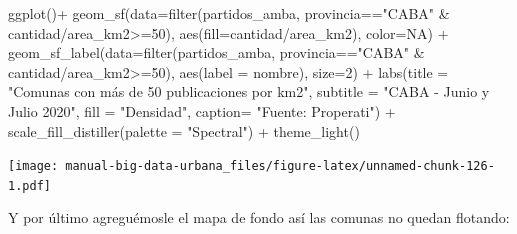 \documentclass[
  spanish,
]{book}
\newenvironment{Shaded}{\begin{snugshade}}{\end{snugshade}}
\newcommand{\AttributeTok}[1]{\textcolor[rgb]{0.77,0.63,0.00}{#1}}
\newcommand{\ConstantTok}[1]{\textcolor[rgb]{0.00,0.00,0.00}{#1}}
\newcommand{\DecValTok}[1]{\textcolor[rgb]{0.00,0.00,0.81}{#1}}
\newcommand{\FunctionTok}[1]{\textcolor[rgb]{0.00,0.00,0.00}{#1}}
\newcommand{\NormalTok}[1]{#1}
\newcommand{\SpecialCharTok}[1]{\textcolor[rgb]{0.00,0.00,0.00}{#1}}
\newcommand{\StringTok}[1]{\textcolor[rgb]{0.31,0.60,0.02}{#1}}
\begin{document}
\begin{Shaded}
\begin{Highlighting}[]
\FunctionTok{ggplot}\NormalTok{()}\SpecialCharTok{+}
  \FunctionTok{geom\_sf}\NormalTok{(}\AttributeTok{data=}\FunctionTok{filter}\NormalTok{(partidos\_amba, provincia}\SpecialCharTok{==}\StringTok{"CABA"} \SpecialCharTok{\&}\NormalTok{ cantidad}\SpecialCharTok{/}\NormalTok{area\_km2}\SpecialCharTok{\textgreater{}=}\DecValTok{50}\NormalTok{), }\FunctionTok{aes}\NormalTok{(}\AttributeTok{fill=}\NormalTok{cantidad}\SpecialCharTok{/}\NormalTok{area\_km2), }\AttributeTok{color=}\ConstantTok{NA}\NormalTok{) }\SpecialCharTok{+}
  \FunctionTok{geom\_sf\_label}\NormalTok{(}\AttributeTok{data=}\FunctionTok{filter}\NormalTok{(partidos\_amba, provincia}\SpecialCharTok{==}\StringTok{"CABA"} \SpecialCharTok{\&}\NormalTok{ cantidad}\SpecialCharTok{/}\NormalTok{area\_km2}\SpecialCharTok{\textgreater{}=}\DecValTok{50}\NormalTok{), }\FunctionTok{aes}\NormalTok{(}\AttributeTok{label =}\NormalTok{ nombre), }\AttributeTok{size=}\DecValTok{2}\NormalTok{) }\SpecialCharTok{+}
    \FunctionTok{labs}\NormalTok{(}\AttributeTok{title =} \StringTok{"Comunas con más de 50 publicaciones por km2"}\NormalTok{,}
         \AttributeTok{subtitle =} \StringTok{"CABA {-} Junio y Julio 2020"}\NormalTok{,}
         \AttributeTok{fill =} \StringTok{"Densidad"}\NormalTok{,}
         \AttributeTok{caption=} \StringTok{"Fuente: Properati"}\NormalTok{) }\SpecialCharTok{+}
  \FunctionTok{scale\_fill\_distiller}\NormalTok{(}\AttributeTok{palette =} \StringTok{"Spectral"}\NormalTok{) }\SpecialCharTok{+}
  \FunctionTok{theme\_light}\NormalTok{()}
\end{Highlighting}
\end{Shaded}

\texttt{[image: manual-big-data-urbana\_files/figure-latex/unnamed-chunk-126-1.pdf]}

Y por último agreguémosle el mapa de fondo así las comunas no quedan flotando:
\end{document}
